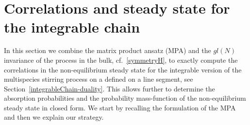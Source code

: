 \documentclass[10pt]{article}
\numberwithin{equation}{section}
\numberwithin{equation}{subsection}
\begin{document}
\section{Correlations and steady state  for the integrable chain}\label{sectionIntegrabiliy}
In this section we combine the matrix product ansatz (MPA) \cite{vanicat2017exact} and  the $gl(N)$ invariance of the process in the bulk, cf.~\eqref{symmetryH}, to exactly compute the correlations in the non-equilibrium steady state
 for the integrable version of the multispecies stirring process on a defined on a line segment, see Section~\ref{integrableChain-duality}. 
This allows further to determine the absorption probabilities and the probability mass-function of the non-equilibrium steady state in closed form.
We start by recalling the formulation of the MPA  and then we explain our strategy.


\end{document}
